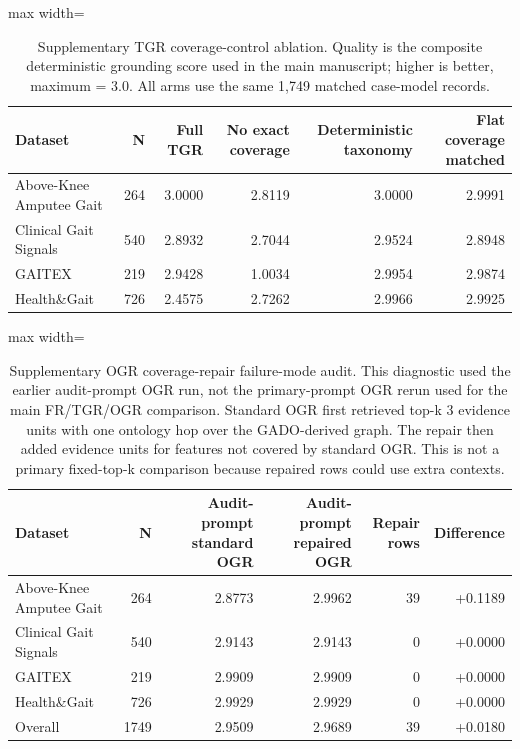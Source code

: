 \documentclass{article}
\begin{document}
\begin{table}[!ht]
\caption{Supplementary TGR coverage-control ablation. Quality is the composite deterministic grounding score used in the main manuscript; higher is better, maximum = 3.0. All arms use the same 1,749 matched case-model records.}
\label{stab:tgr-coverage-control-ablation}
\centering
\scriptsize
\begin{adjustbox}{max width=\textwidth}
\begin{tabular}{@{}lrrrrr@{}}
\toprule
Dataset & N & Full TGR & No exact coverage & Deterministic taxonomy & Flat coverage matched \\
\midrule
Above-Knee Amputee Gait & 264 & 3.0000 & 2.8119 & 3.0000 & 2.9991 \\
Clinical Gait Signals & 540 & 2.8932 & 2.7044 & 2.9524 & 2.8948 \\
GAITEX & 219 & 2.9428 & 1.0034 & 2.9954 & 2.9874 \\
Health\&Gait & 726 & 2.4575 & 2.7262 & 2.9966 & 2.9925 \\
\bottomrule
\end{tabular}
\end{adjustbox}
\end{table}

\begin{table}[!ht]
\caption{Supplementary OGR coverage-repair failure-mode audit. This diagnostic used the earlier audit-prompt OGR run, not the primary-prompt OGR rerun used for the main FR/TGR/OGR comparison. Standard OGR first retrieved top-k 3 evidence units with one ontology hop over the GADO-derived graph. The repair then added evidence units for features not covered by standard OGR. This is not a primary fixed-top-k comparison because repaired rows could use extra contexts.}
\label{stab:ogr-coverage-repair-audit}
\centering
\scriptsize
\begin{adjustbox}{max width=\textwidth}
\begin{tabular}{@{}lrrrrr@{}}
\toprule
Dataset & N & Audit-prompt standard OGR & Audit-prompt repaired OGR & Repair rows & Difference \\
\midrule
Above-Knee Amputee Gait & 264 & 2.8773 & 2.9962 & 39 & +0.1189 \\
Clinical Gait Signals & 540 & 2.9143 & 2.9143 & 0 & +0.0000 \\
GAITEX & 219 & 2.9909 & 2.9909 & 0 & +0.0000 \\
Health\&Gait & 726 & 2.9929 & 2.9929 & 0 & +0.0000 \\
\midrule
Overall & 1749 & 2.9509 & 2.9689 & 39 & +0.0180 \\
\bottomrule
\end{tabular}
\end{adjustbox}
\end{table}
\end{document}
